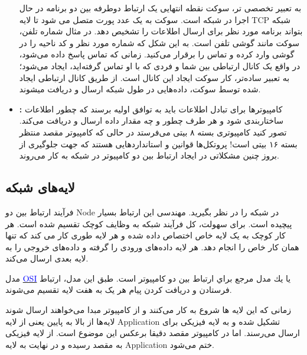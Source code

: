\documentclass[]{article}
\newcommand{\link}[2]{\href{#1}{\textcolor{blue}{#2}}}
\begin{document}
\begin{itemize}
	به تعبیر تخصصی تر، سوکت نقطه انتهایی یک ارتباط دوطرفه بین دو برنامه در حال اجرا در شبکه است. سوکت به یک عدد پورت متصل می شود تا لایه TCP شبکه بتواند برنامه مورد نظر برای ارسال اطلاعات را تشخیص دهد. در مثال شماره تلفن، سوکت مانند گوشی تلفن است. به این شکل که شماره مورد نظر و کد ناحیه را در گوشی وارد کرده و تماس را برقرار می‌کنید. زمانی که تماس پاسخ داده می‌شود، در واقع یک کانال ارتباطی بین شما و فردی که با او تماس گرفته‌اید، ایجاد می‌شود؛ به تعبیر ساده‌تر، کار سوکت ایجاد این کانال است. از طریق کانال ارتباطی ایجاد شده توسط سوکت، داده‌هایی در طول شبکه ارسال و دریافت میشوند. 
	\item \textbf{:} کامپیوترها برای تبادل اطلاعات باید به توافق اولیه برسند که چطور اطلاعات ساختاربندی شود و هر طرف چطور و چه مقدار داده ارسال و دریافت می‌کند. تصور کنید کامپیوتری بسته ۸ بیتی می‌فرستد در حالی که کامپیوتر مقصد منتظر بسته ۱۶ بیتی است! پروتکل‌ها قوانین و استانداردهایی هستند که جهت جلوگیری از بروز چنین مشکلاتی در ایجاد ارتباط بین دو کامپیوتر در شبکه به کار می‌روند. 
\end{itemize}

\subsection*{{\titr لایه‌های شبکه}}
فرآیند ارتباط بین دو Node در شبکه را در نظر بگیرید. مهندسی این ارتباط بسیار پیچیده است. برای سهولت، کل فرآیند شبکه به وظایف کوچک تقسیم شده است. هر کار کوچک به یک لایه خاص اختصاص داده شده و هر لایه طوری کار می کند که تنها همان کار خاص را انجام دهد. هر لایه داده‌های ورودی را گرفته و داده‌های خروجی را به لایه بعدی ارسال می‌کند.

مدل \link{https://www.geeksforgeeks.org/layers-of-osi-model/}{OSI} يا  يك مدل مرجع براي ارتباط بين دو كامپيوتر است. طبق این مدل، ارتباط فرستادن و دریافت کردن پیام هر یک به هفت لایه تقسیم می‌شوند. 

زمانی که این لایه ها شروع به کار می‌کنند و از کامپیوتر مبدا می‌خواهند ارسال شوند لایه‌ها از بالا به پایین یعنی از لایه Application تشکیل شده و به لایه فیزیکی برای ارسال می‌رسند. اما در کامپیوتر مقصد دقیقا برعکس این موضوع است. از لایه فیزیکی به مقصد رسیده و در نهایت به لایه Application ختم می‌شود. 
\end{document}
